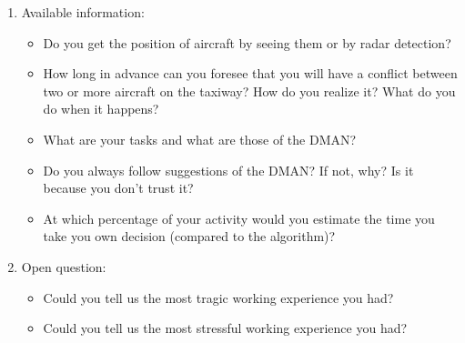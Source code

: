 \documentclass{article}
\begin{document}
\begin{enumerate}
    \item Available information:
        \begin{itemize}
            \item Do you get the position of aircraft by seeing them or by radar detection?
            \item How long in advance can you foresee that you will have a conflict between two or more aircraft on the taxiway? How do you realize it? What do you do when it happens?
            \item What are your tasks and what are those of the DMAN? 
            \item Do you always follow suggestions of the DMAN? If not, why? Is it because you don't trust it?
            \item At which percentage of your activity would you estimate the time you take you own decision (compared to the algorithm)? 
        \end{itemize}
    \item Open question:
    \begin{itemize}
        \item Could you tell us the most tragic working experience you had?
        \item Could you tell us the most stressful working experience you had?
    \end{itemize}
    
\end{enumerate}
\end{document}

